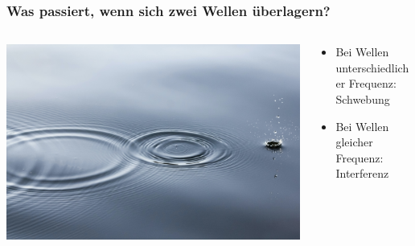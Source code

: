 \documentclass{beamer}
\begin{document}
\begin{frame}
\frametitle{Was passiert, wenn sich zwei Wellen überlagern?}

\begin{columns}[c]

\begin{column}{5cm}

\begin{center}
\includegraphics[width=\textwidth]{wellen.jpg}
\end{center}


\end{column}

\pause

\begin{column}{5cm}

\begin{itemize}
\item
Bei Wellen unterschiedlicher Frequenz:  Schwebung
\item
Bei Wellen gleicher Frequenz: Interferenz 

\end{itemize}


\end{column}

\end{columns}


\end{frame}
\end{document}
